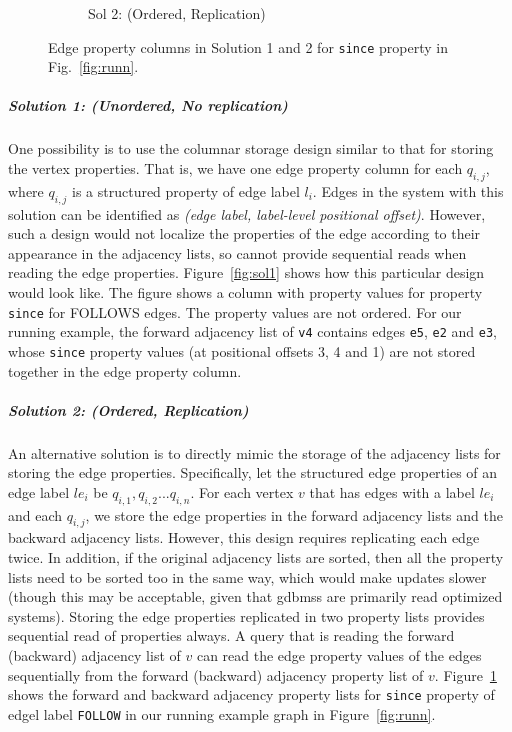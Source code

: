 \begin{figure}
\begin{subfigure}{0.55\textwidth}
		\captionsetup{justification=centering}
		\caption{Sol 2: (Ordered, Replication)}
		\label{fig:sol2}
	\end{subfigure}
	\captionsetup{justification=centering}
	\caption{Edge property columns in Solution 1 and 2 for \texttt{since} property in Fig.~\ref{fig:runn}.}
	\label{fig:sol1and2}
	\vspace{-8pt}
\end{figure}

\vspace{-12pt}
\subparagraph{Solution 1: (Unordered, No replication)}One possibility is to use the columnar storage design similar to that for storing the vertex properties. That is, we have one edge property column for each $q_{i,j}$, where $q_{i,j}$ is a structured property of edge label $l_i$. Edges in the system with this solution can be identified as \emph{(edge label, label-level positional offset)}. However, such a design would not localize the properties of the edge according to their appearance in the adjacency lists, so cannot provide sequential reads when reading the edge properties. Figure~\ref{fig:sol1} shows how this particular design would look like. The figure shows a column with property values for property \texttt{since} for FOLLOWS edges. The property values are not ordered. For our running example, the forward adjacency list of \texttt{v4} contains edges \texttt{e5}, \texttt{e2} and \texttt{e3}, whose \texttt{since} property values (at positional offsets 3, 4 and 1) are not stored together in the edge property column. 

\vspace{-12pt}

\subparagraph{Solution 2: (Ordered, Replication)}An alternative solution is to directly mimic the storage of the adjacency lists for storing the edge properties. Specifically, let the structured edge properties of an edge label $le_i$ be $q_{i,1}, q_{i,2} ... q_{i,n}$. For each vertex $v$ that has edges with a label $le_i$ and each $q_{i,j}$, we store the edge properties in the forward adjacency lists and the backward adjacency lists. However, this design requires replicating each edge twice. In addition, if the original adjacency lists are sorted, then all the property lists need to be sorted too in the same way, which would make updates slower (though this may be acceptable, given that \gls{gdbms}s are primarily read optimized systems). Storing the edge properties replicated in two property lists provides sequential read of properties always. A query that is reading the forward (backward) adjacency list of $v$ can read the edge property values of the edges sequentially from the forward (backward) adjacency property list of $v$. Figure~\ref{fig:sol2} shows the forward and backward adjacency property lists for \texttt{since} property of edgel label \texttt{FOLLOW} in our running example graph in Figure~\ref{fig:runn}.

